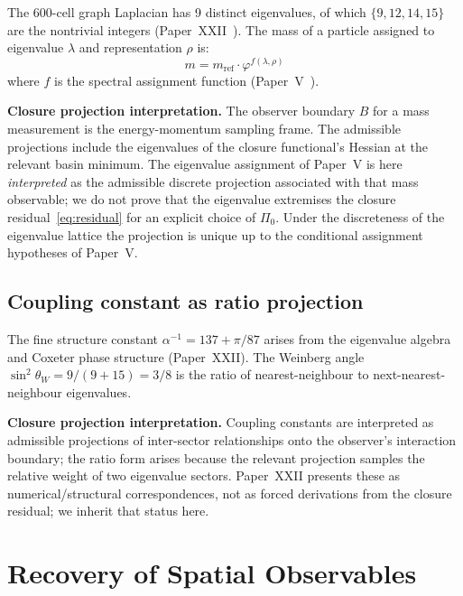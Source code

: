 \documentclass[12pt]{article}
\begin{document}
The 600-cell graph Laplacian has 9 distinct eigenvalues, of which $\{9, 12, 14, 15\}$ are the nontrivial integers (Paper~XXII~\citep{SmartXXII}). The mass of a particle assigned to eigenvalue $\lambda$ and representation $\rho$ is:
\begin{equation}
    m = m_{\mathrm{ref}} \cdot \varphi^{f(\lambda, \rho)}
\end{equation}
where $f$ is the spectral assignment function (Paper~V~\citep{SmartV}).

\textbf{Closure projection interpretation.} The observer boundary $B$ for a mass measurement is the energy-momentum sampling frame. The admissible projections include the eigenvalues of the closure functional's Hessian at the relevant basin minimum. The eigenvalue assignment of Paper~V is here \emph{interpreted} as the admissible discrete projection associated with that mass observable; we do not prove that the eigenvalue extremises the closure residual~\eqref{eq:residual} for an explicit choice of $\Pi_0$. Under the discreteness of the eigenvalue lattice the projection is unique up to the conditional assignment hypotheses of Paper~V.

\subsection{Coupling constant as ratio projection}

The fine structure constant $\alpha^{-1} = 137 + \pi/87$ arises from the eigenvalue algebra and Coxeter phase structure (Paper~XXII). The Weinberg angle $\sin^2\theta_W = 9/(9+15) = 3/8$ is the ratio of nearest-neighbour to next-nearest-neighbour eigenvalues.

\textbf{Closure projection interpretation.} Coupling constants are interpreted as admissible projections of inter-sector relationships onto the observer's interaction boundary; the ratio form arises because the relevant projection samples the relative weight of two eigenvalue sectors. Paper~XXII presents these as numerical/structural correspondences, not as forced derivations from the closure residual; we inherit that status here.

\section{Recovery of Spatial Observables}\label{sec:spatial}
\end{document}
